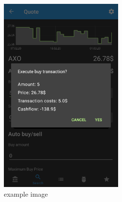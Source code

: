 \documentclass[a4paper]{article}
\begin{document}
\begin{figure}[H]
    \centering
    \includegraphics[height=10cm,keepaspectratio]{./images/quote_buy_confirmation_dialog.png}
    \caption{example image}
    \label{fig:example}
\end{figure}

\pagebreak
\end{document}
